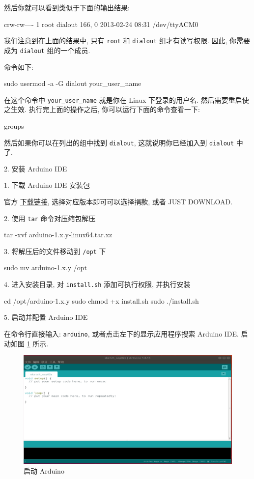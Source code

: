 \documentclass[openany, fontset=windowsold]{ctexbook}
\theoremstyle{kaiti}
\theoremstyle{normal}
\begin{document}
然后你就可以看到类似于下面的输出结果: 

\begin{bash}
  crw-rw—- 1 root dialout 166, 0 2013-02-24 08:31 /dev/ttyACM0
\end{bash}

我们注意到在上面的结果中, 只有 \verb|root| 和 \verb|dialout| 组才有读写权限. 因此, 你需要成为 \verb|dialout| 组的一个成员.

命令如下:

\begin{bash}
  sudo usermod -a -G dialout your_user_name
\end{bash}

在这个命令中 \verb|your_user_name| 就是你在 Linux 下登录的用户名. 然后需要重启使之生效. 执行完上面的操作之后, 你可以运行下面的命令查看一下: 

\begin{bash}
  groups
\end{bash}

然后如果你可以在列出的组中找到 \verb|dialout|, 这就说明你已经加入到 \verb|dialout| 中了.

2. 安装 Arduino IDE

1. 下载 Arduino IDE 安装包

官方 \href{https://www.arduino.cc/en/Main/Software}{下载链接}, 选择对应版本即可可以选择捐款, 或者 JUST DOWNLOAD.

2. 使用 \verb|tar| 命令对压缩包解压

\begin{bash}
  tar -xvf arduino-1.x.y-linux64.tar.xz
\end{bash}

3. 将解压后的文件移动到 \verb|/opt| 下

\begin{bash}
  sudo mv arduino-1.x.y /opt
\end{bash}

4. 进入安装目录, 对 \verb|install.sh| 添加可执行权限, 并执行安装

\begin{bash}
  cd /opt/arduino-1.x.y
  sudo chmod +x install.sh
  sudo ./install.sh
\end{bash}

5. 启动并配置 Arduino IDE

在命令行直接输入: \verb|arduino|, 或者点击左下的显示应用程序搜索 Arduino IDE. 启动如图 \ref{fig:arduino_start} 所示.

\begin{figure}[!ht]
  \centering
  \includegraphics[width=.9\textwidth]{arduino_start.png}
  \caption{启动 Arduino}
  \label{fig:arduino_start}
\end{figure}
\end{document}
